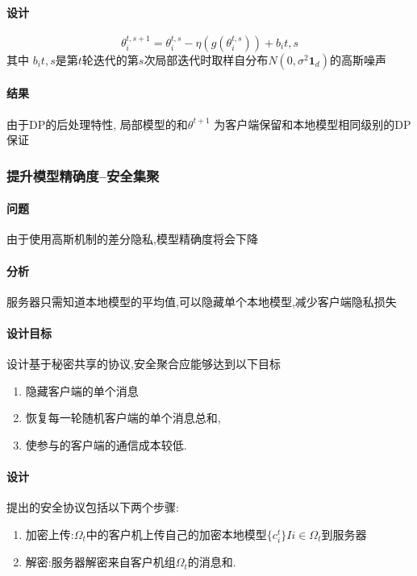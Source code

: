 \paragraph{设计}

\begin{equation}
    \theta_i^{t,s+1}= \theta_i^{t,s}- \eta (g(\theta_i^{t,s})) + b_i{t,s} 
    \label{local_iter}
\end{equation}
其中 $b_i{t,s}$是第$t$轮迭代的第$s$次局部迭代时取样自分布$N(0,\sigma^2 \mathbf{1}_d)$的高斯噪声

\paragraph{结果} 由于DP的后处理特性, 局部模型的和$\theta^{t+1}$ 为客户端保留和本地模型{\color{red}相同级别的DP保证 }

\subsubsection{提升模型精确度--安全集聚}

\paragraph{问题} 由于使用高斯机制的差分隐私,模型精确度将会下降
\paragraph{分析} 服务器只需知道本地模型的平均值,可以隐藏单个本地模型,减少客户端隐私损失
\paragraph{设计目标} 设计基于秘密共享的协议,安全聚合应能够达到以下目标
\begin{enumerate}[label=(\arabic*)]  
    \item 隐藏客户端的单个消息
    \item 恢复每一轮随机客户端的单个消息总和, 
    \item 使参与的客户端的通信成本较低. 
\end{enumerate}


\paragraph{设计}
提出的安全协议包括以下两个步骤:
\begin{enumerate}[label=(\arabic*)]  
    \item 加密上传:$\Omega_t$中的客户机上传自己的加密本地模型$\{ c_i^t\} I{i\in \Omega_t}$到服务器
\item 解密:服务器解密来自客户机组$\Omega_t$的消息和. 

\end{enumerate}

